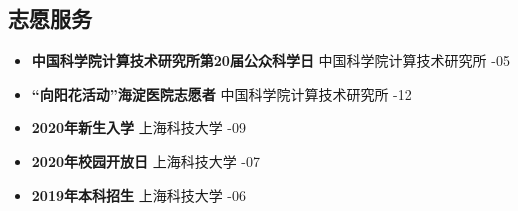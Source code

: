 \documentclass[a4paper,10pt]{ctexart} %
\begin{document}

\begin{keepsection}

\section{志愿服务}
\begin{itemize}
    \item \textbf{中国科学院计算技术研究所第20届公众科学日}  \hfill 中国科学院计算技术研究所 -05
    \item \textbf{“向阳花活动”海淀医院志愿者}  \hfill 中国科学院计算技术研究所 -12
    \item \textbf{2020年新生入学}  \hfill 上海科技大学 -09
    \item \textbf{2020年校园开放日}  \hfill 上海科技大学 -07
    \item \textbf{2019年本科招生}  \hfill 上海科技大学 -06
\end{itemize}

\end{keepsection}
\end{document}

